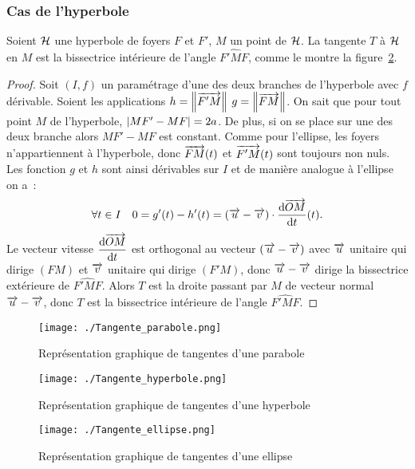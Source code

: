 \subsubsection{Cas de l'hyperbole}
\begin{prop}
    Soient \(\mathcal{H}\) une hyperbole de foyers \(F\) et \(F'\), \(M\) un point de \(\mathcal{H}\). La tangente \(T\) à \(\mathcal{H}\) en \(M\) est la bissectrice intérieure de l'angle \(\widehat{F'MF}\), comme le montre la figure~\ref{fig:tangente_hyperbole}.
\end{prop}
\begin{proof}
  Soit \((I,f)\) un paramétrage d'une des deux branches de l'hyperbole avec \(f\) dérivable. Soient les applications \(h=\left\lVert\overrightarrow{F'M}\right\rVert\) \(g=\left\lVert\overrightarrow{FM}\right\rVert\). On sait que pour tout point \(M\) de l'hyperbole, \(\left\lvert MF'-MF\right\rvert=2a\). De plus, si on se place sur une des deux branche alors \(MF'-MF\) est constant. Comme pour l'ellipse, les foyers n'appartiennent à l'hyperbole, donc \(\overrightarrow{FM}(t)\) et \(\overrightarrow{F'M}(t)\) sont toujours non nuls. Les fonction \(g\) et \(h\) sont ainsi dérivables sur \(I\) et de manière analogue à l'ellipse on a~:
\begin{equation}
\forall t \in I \quad 0=g'(t)-h'(t)=(\overrightarrow{u}-\overrightarrow{v})\cdot \dfrac{\mathrm{d} \overrightarrow{OM}}{\mathrm{d} t}(t).
\end{equation}
 Le vecteur vitesse \(\dfrac{\mathrm{d} \overrightarrow{OM}}{\mathrm{d} t}\) est orthogonal au vecteur \((\overrightarrow{u}-\overrightarrow{v})\) avec \(\overrightarrow{u}\) unitaire qui dirige \((FM)\) et \(\overrightarrow{v}\) unitaire qui dirige \((F'M)\), donc \(\overrightarrow{u}-\overrightarrow{v}\) dirige la bissectrice extérieure de \(\widehat{F'MF}\). Alors \(T\) est la droite passant par \(M\) de vecteur normal \(\overrightarrow{u}-\overrightarrow{v}\), donc \(T\) est la bissectrice intérieure de l'angle \(\widehat{F'MF}\).
\end{proof}
\begin{figure}
    \centering
    \texttt{[image: ./Tangente\_parabole.png]}
    \caption{Représentation graphique de tangentes d'une parabole}
    \label{fig:tangente_parabole}
\end{figure}
\begin{figure}
    \centering
    \texttt{[image: ./Tangente\_hyperbole.png]}
    \caption{Représentation graphique de tangentes d'une hyperbole}
    \label{fig:tangente_hyperbole}
\end{figure}
\begin{figure}
    \centering
    \texttt{[image: ./Tangente\_ellipse.png]}
    \caption{Représentation graphique de tangentes d'une ellipse}
    \label{fig:tangente_ellipse}
\end{figure}
\newpage
